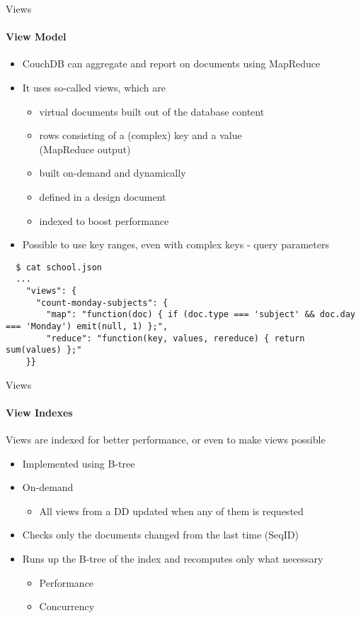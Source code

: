 \documentclass{beamer}
\begin{document}
\begin{frame}[fragile]{Views}
  \framesubtitle{View Model}
  \begin{itemize}
    \item CouchDB can aggregate and report on documents using MapReduce
    \item It uses so-called views, which are 
    \begin{itemize}
      \item virtual documents built out of the database content
      \item rows consisting of a (complex) key and a value\\(MapReduce output)
      \item built on-demand and dynamically
      \item defined in a design document
      \item indexed to boost performance
    \end{itemize}
    \item Possible to use key ranges, even with complex keys - query parameters
  \end{itemize}
  \fontsize{6}{8}\selectfont
  \begin{verbatim}
  $ cat school.json 
  ...
    "views": {
      "count-monday-subjects": {
        "map": "function(doc) { if (doc.type === 'subject' && doc.day === 'Monday') emit(null, 1) };",
        "reduce": "function(key, values, rereduce) { return sum(values) };"
    }}
  \end{verbatim}
\end{frame}

\begin{frame}{Views}
  \framesubtitle{View Indexes}
  Views are indexed for better performance, or even to make views possible
  \begin{itemize}
    \item Implemented using B-tree
    \item On-demand
    \begin{itemize}
      \item All views from a DD updated when any of them is requested
    \end{itemize}
    \item Checks only the documents changed from the last time (SeqID)
    \item Runs up the B-tree of the index and recomputes only what necessary
    \begin{itemize}
      \item Performance
      \item Concurrency
    \end{itemize}
  \end{itemize}
\end{frame}
\end{document}
